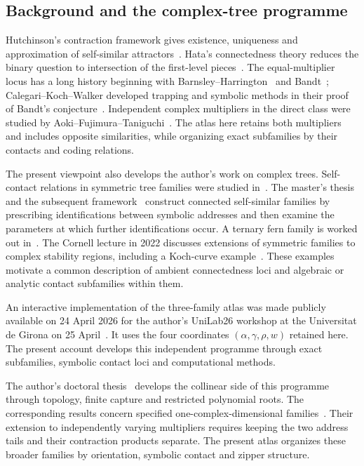 \documentclass[11pt,a4paper]{article}
\theoremstyle{plain}
\theoremstyle{definition}
\theoremstyle{remark}
\begin{document}
\subsection{Background and the complex-tree programme}
Hutchinson's contraction framework gives existence, uniqueness and approximation
of self-similar attractors~\cite{Hutchinson1981}. Hata's connectedness theory
reduces the binary question to intersection of the first-level pieces~\cite{Hata1985}.
The equal-multiplier locus has a long history beginning with
Barnsley--Harrington~\cite{BarnsleyHarrington1985} and
Bandt~\cite{Bandt2002}; Calegari--Koch--Walker developed trapping and symbolic
methods in their proof of Bandt's conjecture~\cite{CalegariKochWalker2017}.
Independent complex multipliers in the direct class were studied by
Aoki--Fujimura--Taniguchi~\cite{AokiFujimuraTaniguchi2014}.
The atlas here retains both multipliers and includes opposite similarities,
while organizing exact subfamilies by their contacts and coding relations.

The present viewpoint also develops the author's work on complex trees.
Self-contact relations in symmetric tree families were studied
in~\cite{Espigule2013}. The master's thesis~\cite{Espigule2018} and the subsequent
framework~\cite{Espigule2019a} construct connected self-similar families by
prescribing identifications between symbolic addresses and then examine the
parameters at which further identifications occur. A ternary fern family is
worked out in~\cite{Espigule2019b}. The Cornell lecture in 2022 discusses
extensions of symmetric families to complex stability regions, including a
Koch-curve example~\cite[27:11--27:58]{Espigule2022Cornell}. These examples motivate a common
description of ambient connectedness loci and algebraic or analytic contact
subfamilies within them.

An interactive implementation of the three-family atlas was made publicly
available on 24 April 2026 for the author's UniLab26 workshop at the Universitat
de Girona on 25 April~\cite{Espigule2026Unilab}. It uses the four coordinates
$(\alpha,\gamma,\rho,w)$ retained here. The present account develops this
independent programme through exact subfamilies, symbolic contact loci and
computational methods.

The author's doctoral thesis~\cite{Espigule2026Thesis} develops the collinear
side of this programme through topology, finite capture and restricted
polynomial roots. The corresponding results concern specified
one-complex-dimensional families~\cite{EspiguleJuherSaldana2024,EspiguleJuher2026,Espigule2026Holes}.
Their extension to independently varying multipliers requires keeping the two
address tails and their contraction products separate. The present atlas
organizes these broader families by orientation, symbolic contact and zipper
structure.
\end{document}
